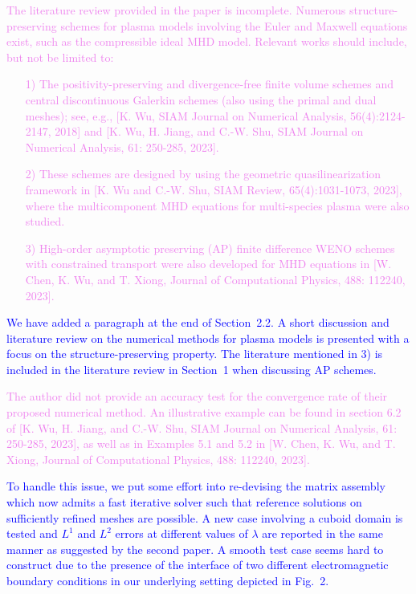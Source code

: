 \documentclass[12pt]{journalrebuttal}
\begin{document}
\nextreviewer
\begin{revcomment}
    \textcolor{violet}{
    The literature review provided in the paper is incomplete.
    Numerous structure-preserving schemes for plasma models involving the Euler
    and Maxwell equations exist, such as the compressible ideal MHD model.
    Relevant works should include, but not be limited to:
    \begin{itemize}
    \item[1)] The positivity-preserving and divergence-free finite volume schemes and
    central discontinuous Galerkin schemes (also using the primal and dual meshes);
    see, e.g., [K. Wu, SIAM Journal on Numerical Analysis, 56(4):2124-2147, 2018]
    and [K. Wu, H. Jiang, and C.-W. Shu, SIAM Journal on Numerical Analysis, 61: 250-285, 2023].
    \item[2)] These schemes are designed by using the geometric quasilinearization framework in
    [K. Wu and C.-W. Shu, SIAM Review, 65(4):1031-1073, 2023],
    where the multicomponent MHD equations for multi-species plasma were also studied.
    \item[3)] High-order asymptotic preserving (AP) finite difference WENO schemes with
    constrained transport were also developed for MHD equations in
    [W. Chen, K. Wu, and T. Xiong, Journal of Computational Physics, 488: 112240, 2023].
    \end{itemize}
    }
\end{revcomment}
\begin{response}
    \textcolor{blue}{
    We have added a paragraph at the end of Section~2.2. A short discussion and literature
    review on the numerical methods for plasma models is presented with a focus on the
    structure-preserving property. The literature mentioned in 3) is included in the
    literature review in Section~1 when discussing AP schemes.
    }
\end{response}


\begin{revcomment}
    \textcolor{violet}{
    The author did not provide an accuracy test
    for the convergence rate of their proposed numerical method.
    An illustrative example can be found in section 6.2 of
    [K. Wu, H. Jiang, and C.-W. Shu, SIAM Journal on Numerical Analysis, 61: 250-285, 2023],
    as well as in Examples 5.1 and 5.2 in [W. Chen, K. Wu, and T. Xiong, Journal of Computational 
    Physics, 488: 112240, 2023].
    }    
\end{revcomment}
\begin{response}
    \textcolor{blue}{
    To handle this issue, we put some effort into re-devising the matrix assembly which
    now admits a fast iterative solver such that reference solutions on sufficiently refined
    meshes are possible. A new case involving a cuboid domain is tested and
    $L^1$ and $L^2$ errors at different values of $\lambda$ are reported in the same manner as 
    suggested by the second paper.
    A smooth test case seems hard to construct due to the presence of the interface of two different
    electromagnetic boundary conditions in our underlying setting depicted in Fig.~2.
    }    
\end{response}
\end{document}
